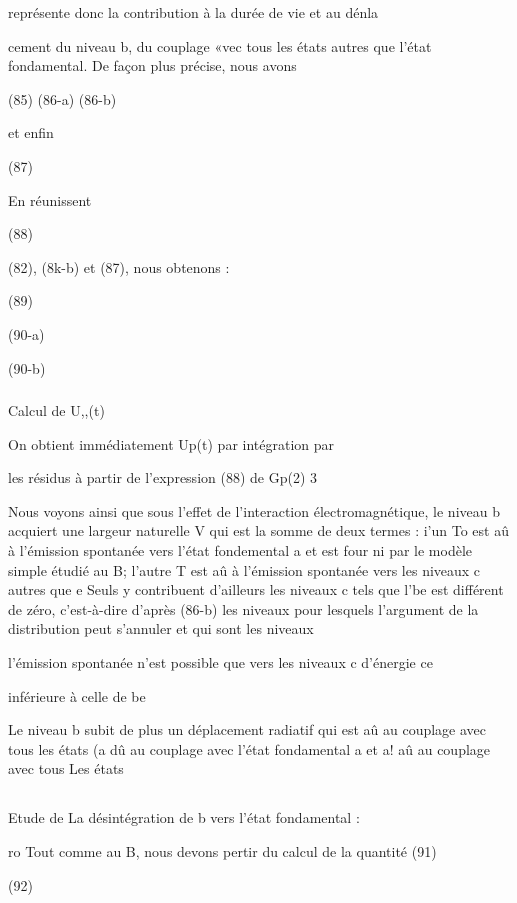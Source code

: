 représente donc la contribution à la durée de vie et au dénla

cement du niveau b, du couplage «vec tous les états  autres que l'état fondamental.
De façon plus précise, nous avons

(85)
(86-a)
(86-b)

et enfin

(87)

En réunissent

(88)

(82), (8k-b) et (87), nous obtenons :

(89)

(90-a)

(90-b)


\subsubsection{} Calcul de U,,(t)%

On obtient immédiatement Up(t) par intégration par

les résidus à partir de l'expression (88) de Gp(2) 3

Nous voyons ainsi que sous l'effet de l'interaction électromagnétique, le niveau b acquiert une largeur naturelle V qui est la somme de
deux termes :
i'un To est aû à l'émission spontanée vers l'état fondemental a et est four
ni par le modèle simple étudié au  B;
l'autre T est aû à l'émission spontanée vers les niveaux c autres que e
Seuls y contribuent d'ailleurs les niveaux c tels que l'be est différent de
zéro, c'est-à-dire d'après (86-b) les niveaux pour lesquels l'argument de la
distribution   peut s'annuler et qui sont les niveaux

 l'émission spontanée n'est possible que vers les niveaux c d'énergie
ce

inférieure à celle de be

Le niveau b subit de plus un déplacement radiatif qui est aû au
couplage avec tous les états (a dû au couplage avec l'état fondamental a et
a! aû au couplage avec tous Les états

\subsection{} Etude de La désintégration de b vers l'état fondamental :%

ro Tout comme au  B, nous devons pertir du calcul de la quantité
(91)

(92)

